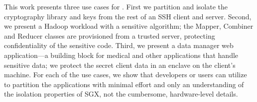 This work presents three use cases for \sysname{}.
First we partition and isolate the 
cryptography library and keys from the rest of an SSH client and  server.
Second, we present a Hadoop workload with a sensitive algorithm;
the %
Mapper, Combiner and Reducer classes are provisioned from a trusted server, protecting confidentiality of the sensitive code.
Third, we present a data manager web application---a building block for medical and other applications that handle sensitive data; 
we protect the secret client data in an enclave on the client's machine.
For each of the use cases, we show that developers or users
can utilize \sysname{} to partition the applications
with minimal effort
and only an understanding of the isolation properties of SGX,
not the cumbersome, hardware-level details.  %


